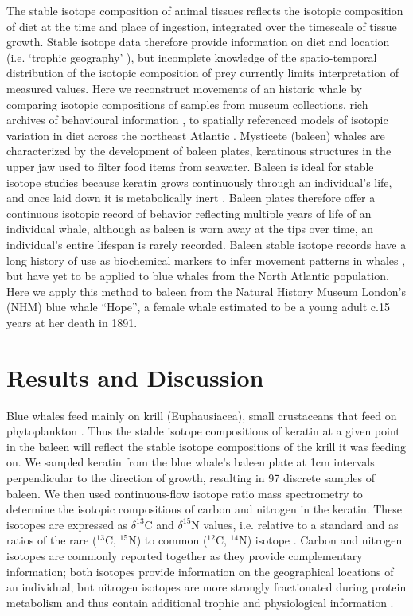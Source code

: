 \documentclass[a4paper,12pt]{article}
\begin{document}
The stable isotope composition of animal tissues reflects the isotopic composition of diet at the time and place of ingestion, integrated over the timescale of tissue growth. 
Stable isotope data therefore provide information on diet and location (i.e. `trophic geography' \cite{bird2018global}), but incomplete knowledge of the spatio-temporal distribution of the isotopic composition of prey currently limits interpretation of measured values. 
Here we reconstruct movements of an historic whale by comparing isotopic compositions of samples from museum collections, rich archives of behavioural information \cite{lister2011natural}, to spatially referenced models of isotopic variation in diet across the northeast Atlantic \cite{hobson1999tracing,hobson2008tracking,eisenmann2016isotopic}. 
Mysticete (baleen) whales are characterized by the development of baleen plates, keratinous structures in the upper jaw used to filter food items from seawater. 
Baleen is ideal for stable isotope studies because keratin grows continuously through an individual's life, and once laid down it is metabolically inert \cite{best1996stable}. 
Baleen plates therefore offer a continuous isotopic record of behavior reflecting multiple years of life of an individual whale, although as baleen is worn away at the tips over time, an individual's entire lifespan is rarely recorded. 
Baleen stable isotope records have a long history of use as biochemical markers to infer movement patterns in whales \cite{ryan2013stable,best1996stable,hobson1998stable,hobson2008tracking}, but have yet to be applied to blue whales from the North Atlantic population. 
Here we apply this method to baleen from the Natural History Museum London's (NHM) blue whale ``Hope'', a female whale estimated to be a young adult c.15 years at her death in 1891.

\section{Results and Discussion}

Blue whales feed mainly on krill (Euphausiacea), small crustaceans that feed on phytoplankton \cite{handbook}.
Thus the stable isotope compositions of keratin at a given point in the baleen will reflect the stable isotope compositions of the krill it was feeding on.
We sampled keratin from the blue whale's baleen plate at 1cm intervals perpendicular to the direction of growth, resulting in 97 discrete samples of baleen.
We then used continuous-flow isotope ratio mass spectrometry to determine the isotopic compositions of carbon and nitrogen in the keratin.
These isotopes are expressed as $\delta^{13}$C and $\delta^{15}$N values, i.e. relative to a standard and as ratios of the rare ($^{13}$C, $^{15}$N) to common ($^{12}$C, $^{14}$N) isotope \cite{west2006stable}.
Carbon and nitrogen isotopes are commonly reported together as they provide complementary information; both isotopes provide information on the geographical locations of an individual, but nitrogen isotopes are more strongly fractionated during protein metabolism and thus contain additional trophic and physiological information \cite{west2006stable}.
\end{document}
